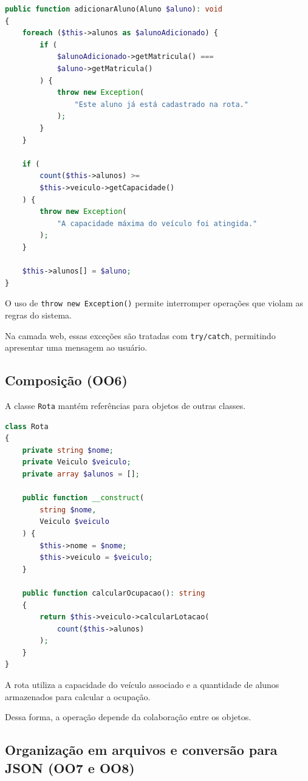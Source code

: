 \documentclass[12pt,a4paper]{article}
\begin{document}
\begin{lstlisting}[language=PHP]
public function adicionarAluno(Aluno $aluno): void
{
    foreach ($this->alunos as $alunoAdicionado) {
        if (
            $alunoAdicionado->getMatricula() ===
            $aluno->getMatricula()
        ) {
            throw new Exception(
                "Este aluno já está cadastrado na rota."
            );
        }
    }

    if (
        count($this->alunos) >=
        $this->veiculo->getCapacidade()
    ) {
        throw new Exception(
            "A capacidade máxima do veículo foi atingida."
        );
    }

    $this->alunos[] = $aluno;
}
\end{lstlisting}

O uso de \texttt{throw new Exception()} permite interromper operações que violam as regras do sistema.

Na camada web, essas exceções são tratadas com \texttt{try/catch}, permitindo apresentar uma mensagem ao usuário.

\subsection{Composição (OO6)}

A classe \texttt{Rota} mantém referências para objetos de outras classes.

\begin{lstlisting}[language=PHP]
class Rota
{
    private string $nome;
    private Veiculo $veiculo;
    private array $alunos = [];

    public function __construct(
        string $nome,
        Veiculo $veiculo
    ) {
        $this->nome = $nome;
        $this->veiculo = $veiculo;
    }

    public function calcularOcupacao(): string
    {
        return $this->veiculo->calcularLotacao(
            count($this->alunos)
        );
    }
}
\end{lstlisting}

A rota utiliza a capacidade do veículo associado e a quantidade de alunos armazenados para calcular a ocupação.

Dessa forma, a operação depende da colaboração entre os objetos.

\subsection{Organização em arquivos e conversão para JSON (OO7 e OO8)}
\end{document}
